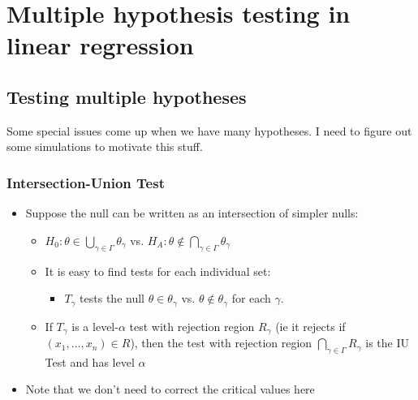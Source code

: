 

\chapter{Multiple hypothesis testing in linear regression}

\section{Testing multiple hypotheses}

Some special issues come up when we have many hypotheses.  I need to
figure out some simulations to motivate this stuff.

\subsection{Intersection-Union Test}

\begin{itemize}
\item Suppose the null can be written as an intersection of simpler
  nulls:
  \begin{itemize}
  \item $H_0: \theta \in \bigcup_{\gamma \in \Gamma} \theta_\gamma$ vs.  $H_A: \theta \notin \bigcap_{\gamma \in \Gamma} \theta_\gamma$
  \item It is easy to find tests for each individual set:
    \begin{itemize}
    \item $T_\gamma$ tests the null $\theta \in \theta_\gamma$ vs. $\theta \notin \theta_\gamma$ for each $\gamma$.
    \end{itemize}
  \item If $T_\gamma$ is a level-$\alpha$ test with rejection region $R_\gamma$ (ie
    it rejects if $(x_1,\dots,x_n) \in R$), then the test with rejection
    region $\bigcap_{\gamma \in \Gamma} R_\gamma$ is the IU Test and has level $\alpha$
  \end{itemize}
\item Note that we don't need to correct the critical values here
\end{itemize}

